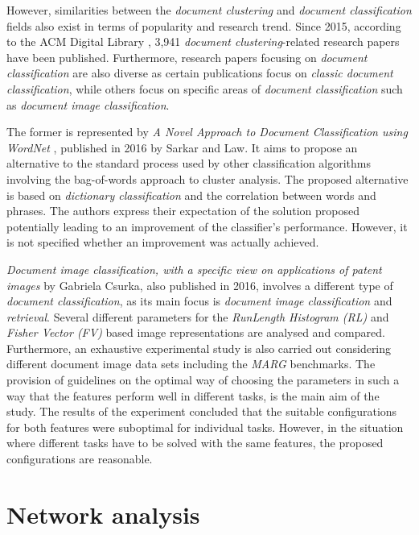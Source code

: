 However, similarities between the \textit{document clustering} and \textit{document classification} fields also exist in terms of popularity and research trend. Since 2015, according to the ACM Digital Library \cite{acm_digital_library}, 3,941 \textit{document clustering}-related research papers have been published. Furthermore, research papers focusing on \textit{document classification} are also diverse as certain publications focus on \textit{classic document classification}, while others focus on specific areas of \textit{document classification} such as \textit{document image classification}.

The former is represented by \textit{A Novel Approach to Document Classification using WordNet} \cite{sarkar2015novel}, published in 2016 by Sarkar and Law. It aims to propose an alternative to the standard process used by other classification algorithms involving the bag-of-words approach to cluster analysis. The proposed alternative is based on \textit{dictionary classification} and the correlation between words and phrases. The authors express their expectation of the solution proposed potentially leading to an improvement of the classifier's performance. However, it is not specified whether an improvement was actually achieved.

\textit{Document image classification, with a specific view on applications of patent images} \cite{csurka2016document} by Gabriela Csurka, also published in 2016, involves a different type of \textit{document classification}, as its main focus is \textit{document image classification} and \textit{retrieval}. Several different parameters for the \textit{RunLength Histogram (RL)} and \textit{Fisher Vector (FV)} based image representations are analysed and compared. Furthermore, an exhaustive experimental study is also carried out considering different document image data sets including the \textit{MARG} benchmarks. The provision of guidelines on the optimal way of choosing the parameters in such a way that the features perform well in different tasks, is the main aim of the study. The results of the experiment concluded that the suitable configurations for both features were suboptimal for individual tasks. However, in the situation where different tasks have to be solved with the same features, the proposed configurations are reasonable.

\section{Network analysis}

